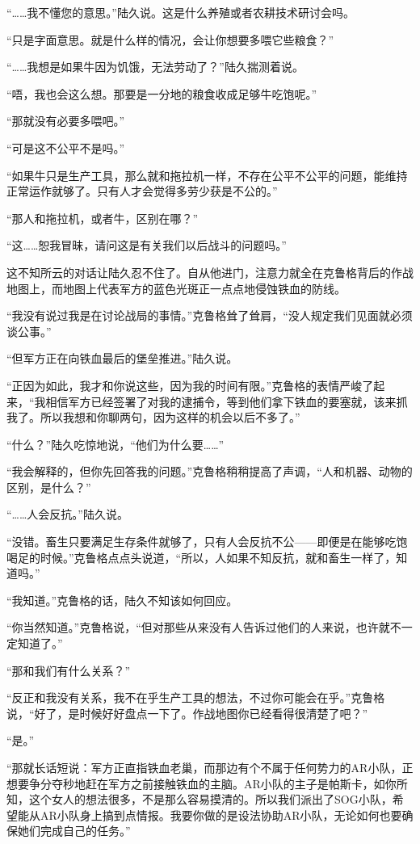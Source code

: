 “……我不懂您的意思。”陆久说。这是什么养殖或者农耕技术研讨会吗。

“只是字面意思。就是什么样的情况，会让你想要多喂它些粮食？”

“……我想是如果牛因为饥饿，无法劳动了？”陆久揣测着说。

“唔，我也会这么想。那要是一分地的粮食收成足够牛吃饱呢。”

“那就没有必要多喂吧。”

“可是这不公平不是吗。”

“如果牛只是生产工具，那么就和拖拉机一样，不存在公平不公平的问题，能维持正常运作就够了。只有人才会觉得多劳少获是不公的。”

“那人和拖拉机，或者牛，区别在哪？”

“这……恕我冒昧，请问这是有关我们以后战斗的问题吗。”

这不知所云的对话让陆久忍不住了。自从他进门，注意力就全在克鲁格背后的作战地图上，而地图上代表军方的蓝色光斑正一点点地侵蚀铁血的防线。

“我没有说过我是在讨论战局的事情。”克鲁格耸了耸肩，“没人规定我们见面就必须谈公事。”

“但军方正在向铁血最后的堡垒推进。”陆久说。

“正因为如此，我才和你说这些，因为我的时间有限。”克鲁格的表情严峻了起来，“我相信军方已经签署了对我的逮捕令，等到他们拿下铁血的要塞就，该来抓我了。所以我想和你聊两句，因为这样的机会以后不多了。”

“什么？”陆久吃惊地说，“他们为什么要……”

“我会解释的，但你先回答我的问题。”克鲁格稍稍提高了声调，“人和机器、动物的区别，是什么？”

“……人会反抗。”陆久说。

“没错。畜生只要满足生存条件就够了，只有人会反抗不公——即便是在能够吃饱喝足的时候。”克鲁格点点头说道，“所以，人如果不知反抗，就和畜生一样了，知道吗。”

“我知道。”克鲁格的话，陆久不知该如何回应。

“你当然知道。”克鲁格说，“但对那些从来没有人告诉过他们的人来说，也许就不一定知道了。”

“那和我们有什么关系？”

“反正和我没有关系，我不在乎生产工具的想法，不过你可能会在乎。”克鲁格说，“好了，是时候好好盘点一下了。作战地图你已经看得很清楚了吧？”

“是。”

“那就长话短说：军方正直指铁血老巢，而那边有个不属于任何势力的AR小队，正想要争分夺秒地赶在军方之前接触铁血的主脑。AR小队的主子是帕斯卡，如你所知，这个女人的想法很多，不是那么容易摸清的。所以我们派出了SOG小队，希望能从AR小队身上搞到点情报。我要你做的是设法协助AR小队，无论如何也要确保她们完成自己的任务。”

